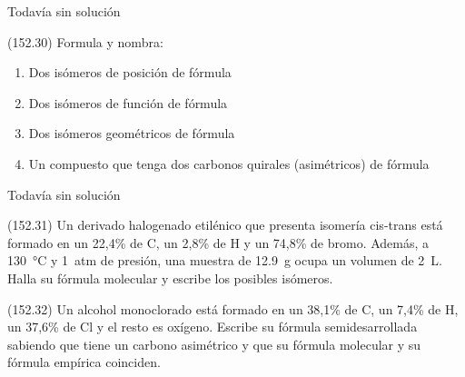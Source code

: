   \begin{solution}[print=false]
    Todavía sin solución
  \end{solution}




  \begin{exercise}[
      tags    = {},
      topics  = {química, química orgánica, orgánica},
      source  = {FQ 1B MGH 2016, p152, e30},
    ]
    (152.30) Formula y nombra:
    \begin{enumerate}
      \item Dos isómeros de posición de fórmula 
      \item Dos isómeros de función de fórmula 
      \item Dos isómeros geométricos de fórmula 
      \item Un compuesto que tenga dos carbonos quirales (asimétricos) de fórmula 
    \end{enumerate}
  \end{exercise}

  \begin{solution}[print=false]
    Todavía sin solución
  \end{solution}




  \begin{exercise}[
      tags    = {},
      topics  = {química, química orgánica, orgánica},
      source  = {FQ 1B MGH 2016, p152, e31},
    ]
    (152.31) Un derivado halogenado etilénico que presenta isomería cis-trans está formado en un 22,4\% de C, un 2,8\% de H y un 74,8\% de bromo. Además, a \SI{130}{\celsius} y \SI{1}{atm} de presión, una muestra de \SI{12,9}{\gram} ocupa un volumen de \SI{2}{\liter}. Halla su fórmula molecular y escribe los posibles isómeros.
  \end{exercise}

  \begin{solution}
  \end{solution}




  \begin{exercise}[
      tags    = {},
      topics  = {química, química orgánica, orgánica},
      source  = {FQ 1B MGH 2016, p152, e32},
    ]
    (152.32) Un alcohol monoclorado está formado en un 38,1\% de C,
    un 7,4\% de H, un 37,6\% de Cl y el resto es oxígeno. Escribe
    su fórmula semidesarrollada sabiendo que tiene un carbono
    asimétrico y que su fórmula molecular y su fórmula empírica
    coinciden.
  \end{exercise}

